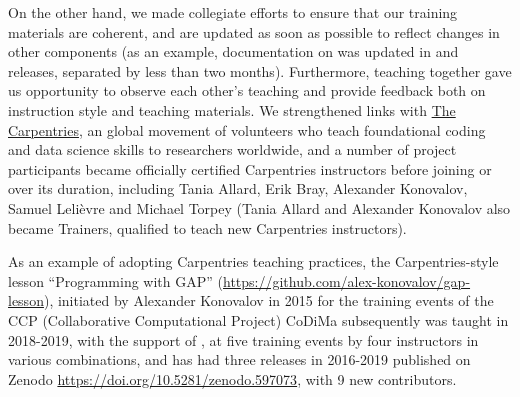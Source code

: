 \documentclass{deliverablereport}
\begin{document}
On the other hand, we made collegiate efforts to ensure that
our training materials are coherent, and are updated as soon as possible
to reflect changes in other \ODK components (as an example,
documentation on  was updated in \GAP and
\SageMath releases, separated by less than two months). Furthermore,
teaching together gave us opportunity to observe each other's
teaching and provide feedback both on instruction style and teaching
materials. We strengthened links with
\href{https://carpentries.org/}{The Carpentries}, an global movement
of volunteers who teach foundational coding and data science skills
to researchers worldwide, and a number of project participants became
officially certified Carpentries instructors before joining \ODK or
over its duration, including Tania Allard, Erik Bray, Alexander Konovalov,
Samuel Leli\`evre and Michael Torpey (Tania Allard and Alexander Konovalov
also became Trainers, qualified to teach new Carpentries instructors).

As an example of adopting Carpentries teaching practices,
the Carpentries-style lesson ``Programming with GAP''
(\url{https://github.com/alex-konovalov/gap-lesson}),
initiated by Alexander Konovalov in 2015 for the training events
of the CCP (Collaborative Computational Project) CoDiMa subsequently
was taught in 2018-2019, with the support of
\ODK, at five training events by four instructors in various
combinations,
and has had three releases in 2016-2019 published on Zenodo
\url{https://doi.org/10.5281/zenodo.597073},
with 9 new contributors. %

\printbibliography
\end{document}
